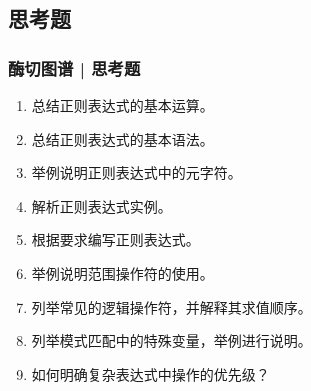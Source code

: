 \subsection{思考题}
\begin{frame}
  \frametitle{酶切图谱 | 思考题}
  \begin{enumerate}
    \item 总结正则表达式的基本运算。
    \item 总结正则表达式的基本语法。
    \item 举例说明正则表达式中的元字符。
    \item 解析正则表达式实例。
    \item 根据要求编写正则表达式。
    \item 举例说明范围操作符的使用。
    \item 列举常见的逻辑操作符，并解释其求值顺序。
    \item 列举模式匹配中的特殊变量，举例进行说明。
    \item 如何明确复杂表达式中操作的优先级？
  \end{enumerate}
\end{frame}



